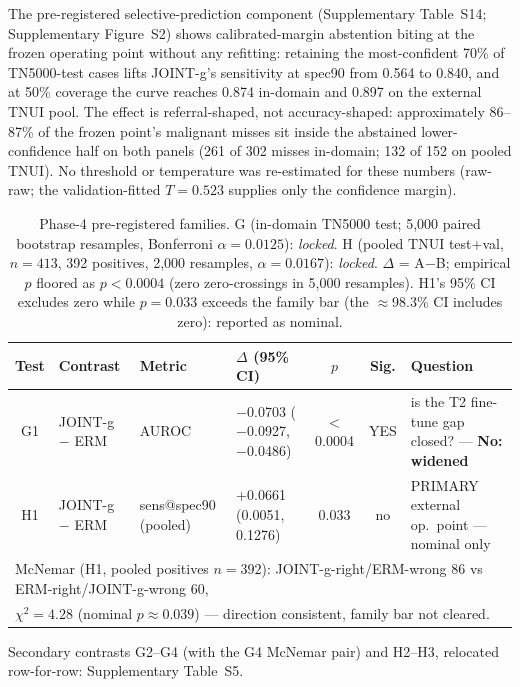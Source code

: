 \documentclass[jimh,article,submit,moreauthors,pdftex]{Definitions/tsp}
\newcommand{\lgShrink}[1]{{\scriptsize #1}}
\begin{document}
The pre-registered selective-prediction component (Supplementary
Table~S14; Supplementary Figure~S2) shows calibrated-margin abstention
biting at the frozen operating point without any refitting: retaining
the most-confident 70\% of TN5000-test cases lifts JOINT-g's
sensitivity at spec90 from 0.564 to 0.840, and at 50\% coverage the
curve reaches 0.874 in-domain and 0.897 on the external TNUI pool. The
effect is referral-shaped, not accuracy-shaped: approximately
86--87\% of the frozen point's malignant misses sit inside the
abstained lower-confidence half on both panels (261 of 302 misses
in-domain; 132 of 152 on pooled TNUI). No threshold or temperature was
re-estimated for these numbers (raw-raw; the validation-fitted
$T{=}0.523$ supplies only the confidence margin).

\begin{table}[!ht]
\centering\small
\caption{Phase-4 pre-registered families. G (in-domain TN5000 test; 5,000
paired bootstrap resamples, Bonferroni $\alpha{=}0.0125$): \emph{locked}.
H (pooled TNUI test+val, $n{=}413$, 392 positives, 2,000 resamples,
$\alpha{=}0.0167$): \emph{locked}.
$\Delta$ = A$-$B; empirical $p$ floored as $p{<}0.0004$
(zero zero-crossings in 5,000 resamples). H1's 95\% CI excludes zero while
$p{=}0.033$ exceeds the family bar (the $\approx$98.3\% CI includes zero):
reported as nominal.}
\label{tab:phase4_families}
\lgShrink{%
\begin{tabular}{clllccl}
\toprule
Test & Contrast & Metric & $\Delta$ (95\% CI) & $p$ & Sig. & Question \\
\midrule
G1 & JOINT-g $-$ ERM & AUROC & $-$0.0703 ($-$0.0927, $-$0.0486) & $<$0.0004 & YES & is the T2 fine-tune gap closed? --- \textbf{No: widened} \\
\midrule
H1 & JOINT-g $-$ ERM & sens@spec90 (pooled) & +0.0661 (0.0051, 0.1276) & 0.033 & no & PRIMARY external op.\ point --- nominal only \\
\multicolumn{7}{l}{McNemar (H1, pooled positives $n{=}392$): JOINT-g-right/ERM-wrong 86 vs ERM-right/JOINT-g-wrong 60,}\\
\multicolumn{7}{l}{$\chi^2 = 4.28$ (nominal $p \approx 0.039$) --- direction consistent, family bar not cleared.}\\
\bottomrule
\end{tabular}%
}

{\footnotesize Secondary contrasts G2--G4 (with the G4 McNemar pair) and H2--H3, relocated row-for-row: Supplementary Table~S5.}
\end{table}
\end{document}
